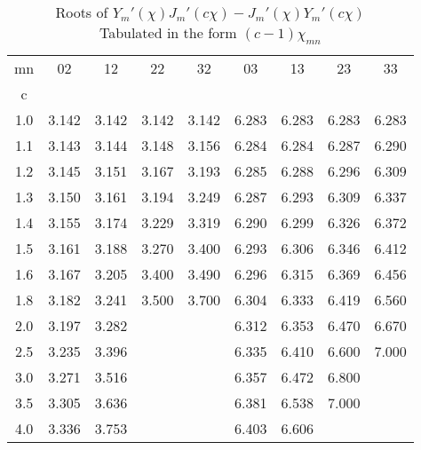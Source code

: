 \begin{table}[htbp]
\begin{center}
\begin{tabular}{| c | c | c | c | c | c | c | c | c |}
\hline
mn & 02 & 12 & 22 & 32 & 03 & 13 & 23 & 33 \\ 
c &  &  &  &  &  &  &  &  \\ 
\hline
1.0 & 3.142 & 3.142 & 3.142 & 3.142 & 6.283 & 6.283 & 6.283 & 6.283 \\ 
1.1 & 3.143 & 3.144 & 3.148 & 3.156 & 6.284 & 6.284 & 6.287 & 6.290 \\ 
1.2 & 3.145 & 3.151 & 3.167 & 3.193 & 6.285 & 6.288 & 6.296 & 6.309 \\ 
1.3 & 3.150 & 3.161 & 3.194 & 3.249 & 6.287 & 6.293 & 6.309 & 6.337 \\ 
1.4 & 3.155 & 3.174 & 3.229 & 3.319 & 6.290 & 6.299 & 6.326 & 6.372 \\ 
1.5 & 3.161 & 3.188 & 3.270 & 3.400 & 6.293 & 6.306 & 6.346 & 6.412 \\ 
1.6 & 3.167 & 3.205 & 3.400 & 3.490 & 6.296 & 6.315 & 6.369 & 6.456 \\ 
1.8 & 3.182 & 3.241 & 3.500 & 3.700 & 6.304 & 6.333 & 6.419 & 6.560 \\ 
2.0 & 3.197 & 3.282 &  &  & 6.312 & 6.353 & 6.470 & 6.670 \\ 
2.5 & 3.235 & 3.396 &  &  & 6.335 & 6.410 & 6.600 & 7.000 \\ 
3.0 & 3.271 & 3.516 &  &  & 6.357 & 6.472 & 6.800 &  \\ 
3.5 & 3.305 & 3.636 &  &  & 6.381 & 6.538 & 7.000 &  \\ 
4.0 & 3.336 & 3.753 &  &  & 6.403 & 6.606 &  &  \\ 
\hline
\end{tabular}
\caption{ \centering Roots of $Y_m'(\chi) J_m'(c \chi) - J_m'(\chi) Y_m'(c \chi)$ \\
Tabulated in the form $(c-1)\chi_{mn}$}
\label{tab:TE-chi-2}
\end{center}
\end{table}